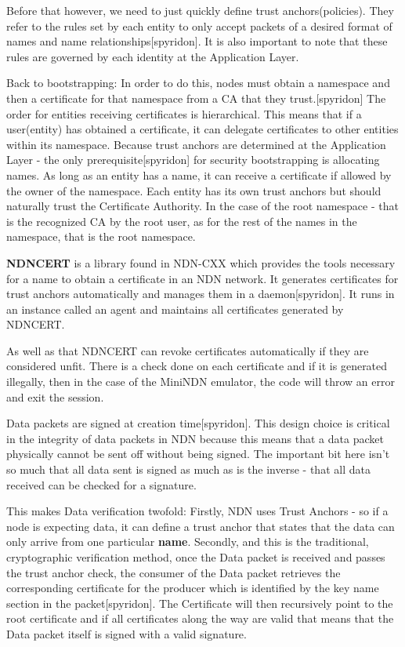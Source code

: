  Before that however, we need to just quickly define trust anchors(policies). They refer to the rules set by each entity to only accept packets of a desired format of names and name relationships[spyridon]. It is also important to note that these rules are governed by each identity at the Application Layer.
 
  Back to bootstrapping: In order to do this, nodes must obtain a namespace and then a certificate for that namespace from a CA that they trust.[spyridon] The order for entities receiving certificates is hierarchical. This means that if a user(entity) has obtained a certificate, it can delegate certificates to other entities within its namespace.
 Because trust anchors are determined at the Application Layer - the only prerequisite[spyridon] for security bootstrapping is allocating names. As long as an entity has a name, it can receive a certificate if allowed by the owner of the namespace. 
 Each entity has its own trust anchors but should naturally trust the Certificate Authority. In the case of the root namespace - that is the recognized CA by the root user, as for the rest of the names in the namespace, that is the root namespace.\par
 \textbf{NDNCERT} is a library found in NDN-CXX which provides the tools necessary for a name to obtain a certificate in an NDN network. It generates certificates for trust anchors automatically and manages them in a daemon[spyridon]. It runs in an instance called an agent and maintains all certificates generated by NDNCERT.\par
As well as that NDNCERT can revoke certificates automatically if they are considered unfit. There is a check done on each certificate and if it is generated illegally, then in the case of the MiniNDN emulator, the code will throw an error and exit the session.\par
Data packets are signed at creation time[spyridon]. This design choice is critical in the integrity of data packets in NDN because this means that a data packet physically cannot be sent off without being signed. The important bit here isn't so much that all data sent is signed as much as is the inverse - that all data received can be checked for a signature. 

This makes Data verification twofold: Firstly, NDN uses Trust Anchors - so if a node is expecting data, it can define a trust anchor that states that the data can only arrive from one particular \textbf{name}. Secondly, and this is the traditional, cryptographic verification method, once the Data packet is received and passes the trust anchor check, the consumer of the Data packet retrieves the corresponding certificate for the producer which is identified by the key name section in the packet[spyridon]. The Certificate will then recursively point to the root certificate and if all certificates along the way are valid that means that the Data packet itself is signed with a valid signature.


